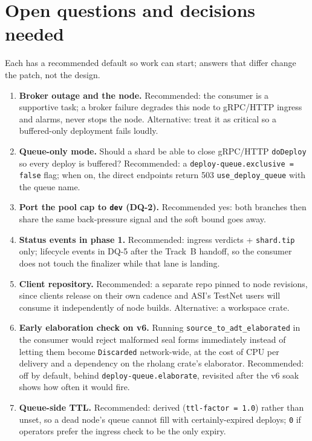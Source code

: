 \documentclass[11pt]{article}
\newcommand{\code}[1]{\texttt{#1}}
\newcommand{\dev}{\code{dev}}
\begin{document}
\section{Open questions and decisions needed}
\label{sec:open}

Each has a recommended default so work can start; answers that differ change the
patch, not the design.
\begin{enumerate}[leftmargin=2em]
  \item \textbf{Broker outage and the node.} Recommended: the consumer is a
    supportive task; a broker failure degrades this node to gRPC/HTTP ingress and
    alarms, never stops the node. Alternative: treat it as critical so a
    buffered-only deployment fails loudly.
  \item \textbf{Queue-only mode.} Should a shard be able to close gRPC/HTTP
    \code{doDeploy} so every deploy is buffered? Recommended: a
    \code{deploy-queue.exclusive = false} flag; when on, the direct endpoints return
    503 \code{use\_deploy\_queue} with the queue name.
  \item \textbf{Port the pool cap to \dev{} (DQ-2).} Recommended yes: both branches
    then share the same back-pressure signal and the soft bound goes away.
  \item \textbf{Status events in phase 1.} Recommended: ingress verdicts +
    \code{shard.tip} only; lifecycle events in DQ-5 after the Track~B handoff, so the
    consumer does not touch the finalizer while that lane is landing.
  \item \textbf{Client repository.} Recommended: a separate
     repo pinned to node revisions, since
    clients release on their own cadence and ASI's TestNet users will consume it
    independently of node builds. Alternative: a  workspace crate.
  \item \textbf{Early elaboration check on v6.} Running
    \code{source\_to\_adt\_elaborated} in the consumer would reject malformed seal
    forms immediately instead of letting them become \code{Discarded} network-wide,
    at the cost of CPU per delivery and a dependency on the rholang crate's
    elaborator. Recommended: off by default, behind \code{deploy-queue.elaborate},
    revisited after the v6 soak shows how often it would fire.
  \item \textbf{Queue-side TTL.} Recommended: derived (\code{ttl-factor = 1.0})
    rather than unset, so a dead node's queue cannot fill with certainly-expired
    deploys; \code{0} if operators prefer the ingress check to be the only expiry.

\end{enumerate}
\end{document}
